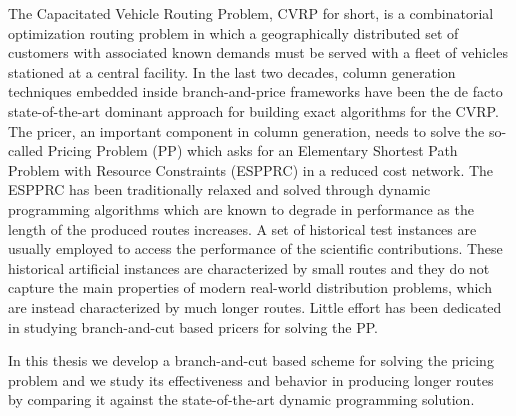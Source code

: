 \noindent The Capacitated Vehicle Routing Problem, CVRP for short,
is a combinatorial optimization routing problem in which
a geographically distributed set of
customers with associated known demands must be served with a fleet of vehicles
stationed at a central facility.
In the last two decades,
column generation techniques embedded inside branch-and-price frameworks
have been the de facto state-of-the-art dominant approach
for building exact algorithms for the CVRP.
The pricer, an important component in column generation, needs to solve
the so-called Pricing Problem (PP) which asks for an
Elementary Shortest Path Problem with Resource Constraints (ESPPRC)
in a reduced cost network.
The ESPPRC has been traditionally relaxed and solved through dynamic programming
algorithms which are known to degrade in performance as
the length of the produced routes increases.
A set of historical test instances are usually employed to access
the performance of the scientific contributions.
These historical artificial instances are characterized by small routes
and they do not capture the main properties of modern real-world distribution
problems,
which are instead characterized by much longer routes.
Little effort has been dedicated in studying branch-and-cut
based pricers for solving the PP.

\noindent In this thesis we develop
a branch-and-cut based scheme for solving the pricing problem
and we study its effectiveness and behavior in producing longer routes
by comparing it against the state-of-the-art dynamic programming solution.

